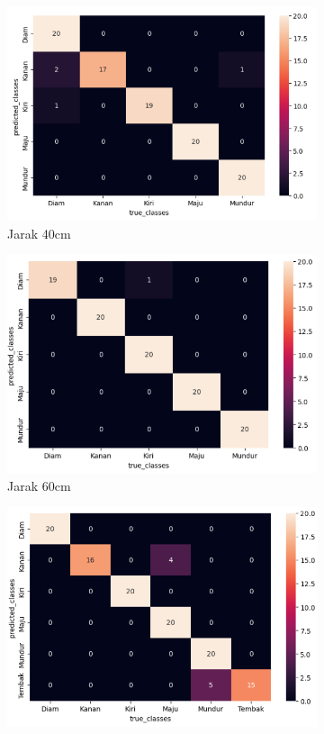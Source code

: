 \begin{figure}[H]
  \begin{subfigure}{0.4\textwidth}
    \centering
    \includegraphics[width=\linewidth]{../Gambar/cm40.png}
    \caption{Jarak 40cm}
    \label{fig:cm40}
  \end{subfigure}
  \begin{subfigure}{0.4\textwidth}
    \centering
    \includegraphics[width=\linewidth]{../Gambar/cm60.png}
    \caption{Jarak 60cm}
    \label{fig:cm60}
  \end{subfigure}
  \begin{subfigure}{0.4\textwidth}
    \centering
    \includegraphics[width=\linewidth]{../Gambar/cm80.png}

\end{subfigure}
\end{figure}
